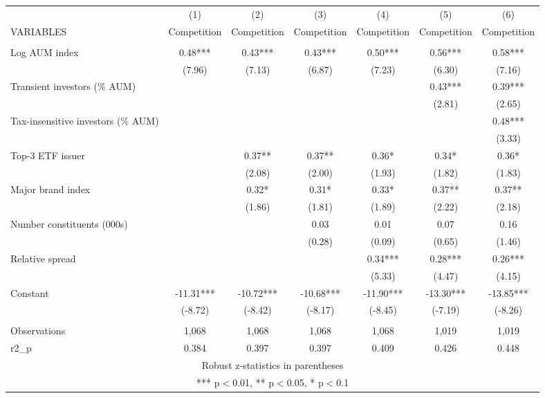 \documentclass[]{article}
\begin{document}
\begin{tabular}{lcccccc} \hline
 & (1) & (2) & (3) & (4) & (5) & (6) \\
VARIABLES & Competition & Competition & Competition & Competition & Competition & Competition \\ \hline
 &  &  &  &  &  &  \\
Log AUM index & 0.48*** & 0.43*** & 0.43*** & 0.50*** & 0.56*** & 0.58*** \\
 & (7.96) & (7.13) & (6.87) & (7.23) & (6.30) & (7.16) \\
Transient investors (\% AUM) &  &  &  &  & 0.43*** & 0.39*** \\
 &  &  &  &  & (2.81) & (2.65) \\
Tax-insensitive investors (\% AUM) &  &  &  &  &  & 0.48*** \\
 &  &  &  &  &  & (3.33) \\
Top-3 ETF issuer &  & 0.37** & 0.37** & 0.36* & 0.34* & 0.36* \\
 &  & (2.08) & (2.00) & (1.93) & (1.82) & (1.83) \\
Major brand index &  & 0.32* & 0.31* & 0.33* & 0.37** & 0.37** \\
 &  & (1.86) & (1.81) & (1.89) & (2.22) & (2.18) \\
Number constituents (000s) &  &  & 0.03 & 0.01 & 0.07 & 0.16 \\
 &  &  & (0.28) & (0.09) & (0.65) & (1.46) \\
Relative spread &  &  &  & 0.34*** & 0.28*** & 0.26*** \\
 &  &  &  & (5.33) & (4.47) & (4.15) \\
Constant & -11.31*** & -10.72*** & -10.68*** & -11.90*** & -13.30*** & -13.85*** \\
 & (-8.72) & (-8.42) & (-8.17) & (-8.45) & (-7.19) & (-8.26) \\
 &  &  &  &  &  &  \\
Observations & 1,068 & 1,068 & 1,068 & 1,068 & 1,019 & 1,019 \\
 r2\_p & 0.384 & 0.397 & 0.397 & 0.409 & 0.426 & 0.448 \\ \hline
\multicolumn{7}{c}{ Robust z-statistics in parentheses} \\
\multicolumn{7}{c}{ *** p$<$0.01, ** p$<$0.05, * p$<$0.1} \\
\end{tabular}
\end{document}

